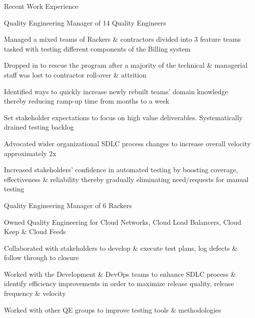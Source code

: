 \documentclass{resume} %
\begin{document}
\begin{rSection}{Recent Work Experience}
  
\begin{rSubsection}{}{}{}{}
{Quality Engineering Manager of 14 Quality Engineers}
  \item Managed a mixed teams of Rackers \& contractors divided into 3 feature teams tasked with testing different components of the Billing system
\item Dropped in to rescue the program after a majority of the technical \& managerial staff was lost to contractor roll-over \& attrition
\item Identified ways to quickly increase newly rebuilt teams' domain knowledge thereby reducing ramp-up time from months to a week
\item Set stakeholder expectations to focus on high value deliverables. Systematically drained testing backlog
\item Advocated wider organizational SDLC process changes to increase overall velocity approximately 2x
\item Increased stakeholders' confidence in automated testing by boosting coverage, effectiveness \& reliability thereby gradually eliminating need/requests for manual testing
  
\end{rSubsection}\vspace{-1em}



\begin{rSubsection}{}{}{}{}
{Quality Engineering Manager of 6 Rackers}

\item Owned Quality Engineering for Cloud Networks, Cloud Load Balancers, Cloud Keep \& Cloud Feeds
\item Collaborated with stakeholders to develop \& execute test plans, log defects \& follow through to closure
\item Worked with the Development \& DevOps teams to enhance SDLC process \& identify efficiency improvements in order to maximize release quality, release frequency \& velocity
\item Worked with other QE groups to improve testing tools \& methodologies


\end{rSubsection}
\end{rSection}
\end{document}
